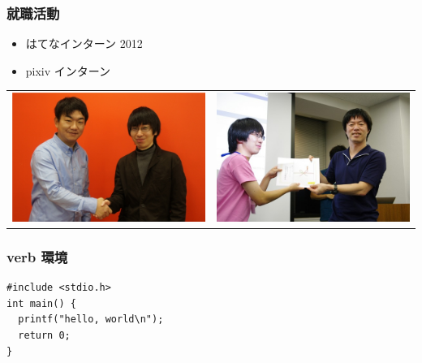 \documentclass[12pt,ignorenonframetext,dvipdfmx,cjk,hyperref={bookmarks=false,compress,slidestop}]{beamer}
\begin{document}
\begin{frame}\frametitle{就職活動}

\begin{itemize}
\itemsep1pt\parskip0pt
\item
  はてなインターン 2012
\item
  pixiv インターン
\end{itemize}

\vspace{-20pt}

\begin{center}
 \begin{tabular}{cc}
   \includegraphics[clip, height=38truemm]{pixiv} & \includegraphics[clip, height=38truemm]{hatena} \\ 
  \end{tabular}
 \end{center}

\end{frame}

\begin{frame}[fragile]\frametitle{verb 環境}

\begin{verbatim}
#include <stdio.h>
int main() {
  printf("hello, world\n");
  return 0;
}
\end{verbatim}

\end{frame}
\end{document}
